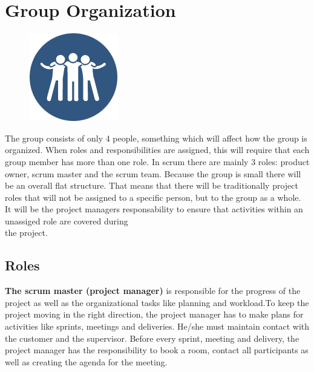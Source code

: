 \clearpage
\section{Group Organization}

\begin{figure}
  \begin{center}
  \includegraphics[scale=0.72]{pictures/team.png}
  \end{center}
\end{figure}

The group consists of only 4 people, something which will affect how the group is organized. When roles and responsibilities are assigned, this will require that each group member has more than one role. In scrum there are mainly 3 roles: product owner, scrum master and the scrum team. Because the group is small there will be an overall flat structure. That means that
there will be traditionally project roles that will not be assigned to a specific person, but to the group as a whole. It will be the project managers responsability to ensure that activities within an unassiged role are covered during \\ the project.

\subsection{Roles}

{\bf The scrum master (project manager)} is responsible for the progress of the project as well as the organizational tasks like planning and workload.To keep the project moving in the right direction, the project manager has to make plans for activities like sprints, meetings and deliveries. He/she must maintain contact with the customer and the supervisor.
Before every sprint, meeting and delivery, the project manager has the responsibility to book a room, contact all
participants as well as creating the agenda for the meeting. \\

